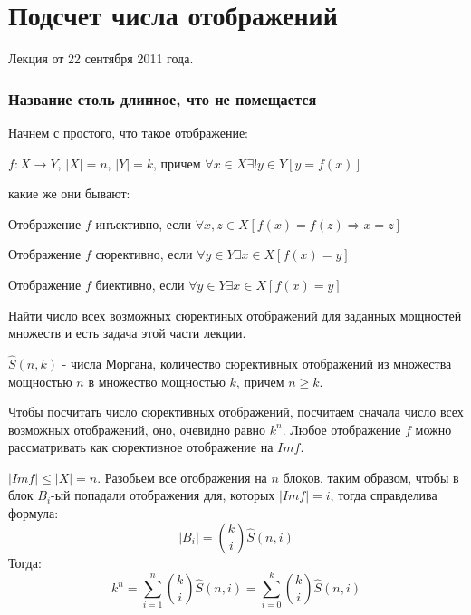 \chapter{Подсчет числа отображений}

Лекция от 22 сентября 2011 года.

\subsection{Название столь длинное, что не помещается}

Начнем с простого, что такое отображение:

\begin{Def}
$f : X \rightarrow Y$, $\left|X\right|=n$, $\left|Y\right|=k$, причем $\forall x \in X \exists ! y \in Y [y = f\left(x\right)]$
\end{Def}

какие же они бывают:

\begin{Def}
Отображение $f$ инъективно, если $\forall x,z \in X [f\left(x\right)=f\left(z\right) \Rightarrow x=z]$
\end{Def}

\begin{Def}
Отображение $f$ сюрективно, если $\forall y \in Y \exists x \in X [f\left(x\right)=y]$
\end{Def}

\begin{Def}
Отображение $f$ биективно, если $\forall y \in Y \exists x \in X [f\left(x\right)=y]$
\end{Def}

Найти число всех возможных сюректиных отображений для заданных мощностей множеств и есть задача этой части лекции.

\begin{Def}
$\hat S \left(n,k\right)$ - числа Моргана, количество сюрективных отображений из множества мощностью $n$ в множество мощностью $k$, причем $n \ge k$.
\end{Def}

Чтобы посчитать число сюрективных отображений, посчитаем сначала число всех возможных отображений, оно, очевидно равно $k^n$. Любое отображение $f$ можно рассматривать как сюрективное отображение на $Im f$.

$\left|Im f\right| \le \left|X\right| = n$. Разобьем все отображения на $n$ блоков, таким образом, чтобы в блок $B_i$-ый попадали отображения для, которых $\left|Im f\right|=i$, тогда справделива формула:
\[
	\left| B_i \right| = \binom{k}{i} \hat S \left(n,i\right)
\]
Тогда:
\[
	k^n = \sum_{i=1}^n \binom{k}{i} \hat S \left(n,i\right) = \sum_{i=0}^k \binom{k}{i} \hat S \left(n,i\right)
\]

